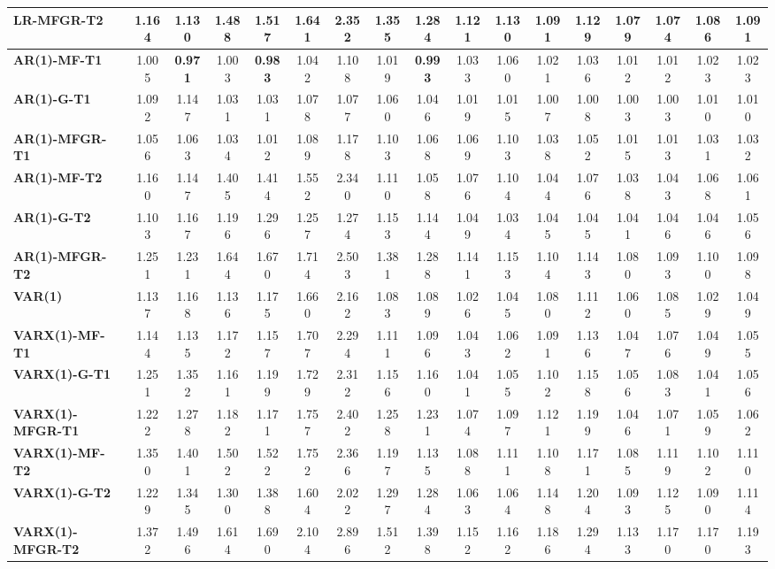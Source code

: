 \documentclass[Theme1]{{template_material/eurostat}}
\begin{document}
\begin{landscape}
\begin{table}[h]
{\begin{tabular}{l|cc|cc|cc|cc|cc|cc|cc|cc}
\textbf{LR-MFGR-T2} & 1.164 & 1.130 & 1.488 & 1.517 & 1.641 & 2.352 & 1.355 & 1.284 & 1.121 & 1.130 & 1.091 & 1.129 & 1.079 & 1.074 & 1.086 & 1.091 \\
\hline
\textbf{AR(1)-MF-T1} & 1.005 & \textbf{0.971} & 1.003 & \textbf{0.983} & 1.042 & 1.108 & 1.019 & \textbf{0.993} & 1.033 & 1.060 & 1.021 & 1.036 & 1.012 & 1.012 & 1.023 & 1.023 \\
\textbf{AR(1)-G-T1} & 1.092 & 1.147 & 1.031 & 1.031 & 1.078 & 1.077 & 1.060 & 1.046 & 1.019 & 1.015 & 1.007 & 1.008 & 1.003 & 1.003 & 1.010 & 1.010 \\
\textbf{AR(1)-MFGR-T1} & 1.056 & 1.063 & 1.034 & 1.012 & 1.089 & 1.178 & 1.103 & 1.068 & 1.069 & 1.103 & 1.038 & 1.052 & 1.015 & 1.013 & 1.031 & 1.032 \\
\textbf{AR(1)-MF-T2} & 1.160 & 1.147 & 1.405 & 1.414 & 1.552 & 2.340 & 1.110 & 1.058 & 1.076 & 1.104 & 1.044 & 1.076 & 1.038 & 1.043 & 1.068 & 1.061 \\
\textbf{AR(1)-G-T2} & 1.103 & 1.167 & 1.196 & 1.296 & 1.257 & 1.274 & 1.153 & 1.144 & 1.049 & 1.034 & 1.045 & 1.045 & 1.041 & 1.046 & 1.046 & 1.056 \\
\textbf{AR(1)-MFGR-T2} & 1.251 & 1.231 & 1.644 & 1.670 & 1.714 & 2.503 & 1.381 & 1.288 & 1.141 & 1.153 & 1.104 & 1.143 & 1.080 & 1.093 & 1.100 & 1.098 \\
\hline
\textbf{VAR(1)} & 1.137 & 1.168 & 1.136 & 1.175 & 1.660 & 2.162 & 1.083 & 1.089 & 1.026 & 1.045 & 1.080 & 1.112 & 1.060 & 1.085 & 1.029 & 1.049 \\
\textbf{VARX(1)-MF-T1} & 1.144 & 1.135 & 1.172 & 1.157 & 1.707 & 2.294 & 1.111 & 1.096 & 1.043 & 1.062 & 1.091 & 1.136 & 1.047 & 1.076 & 1.049 & 1.055 \\
\textbf{VARX(1)-G-T1} & 1.251 & 1.352 & 1.161 & 1.199 & 1.729 & 2.312 & 1.156 & 1.160 & 1.041 & 1.055 & 1.102 & 1.158 & 1.056 & 1.083 & 1.041 & 1.056 \\
\textbf{VARX(1)-MFGR-T1} & 1.222 & 1.278 & 1.182 & 1.171 & 1.757 & 2.402 & 1.258 & 1.231 & 1.074 & 1.097 & 1.121 & 1.199 & 1.046 & 1.071 & 1.059 & 1.062 \\
\textbf{VARX(1)-MF-T2} & 1.350 & 1.401 & 1.502 & 1.522 & 1.752 & 2.366 & 1.197 & 1.135 & 1.088 & 1.111 & 1.108 & 1.171 & 1.085 & 1.119 & 1.102 & 1.110 \\
\textbf{VARX(1)-G-T2} & 1.229 & 1.345 & 1.300 & 1.388 & 1.604 & 2.022 & 1.297 & 1.284 & 1.063 & 1.064 & 1.148 & 1.204 & 1.093 & 1.125 & 1.090 & 1.114 \\
\textbf{VARX(1)-MFGR-T2} & 1.372 & 1.496 & 1.614 & 1.690 & 2.104 & 2.896 & 1.512 & 1.398 & 1.152 & 1.162 & 1.186 & 1.294 & 1.133 & 1.170 & 1.170 & 1.193 \\

\end{tabular}}
\end{table}
\end{landscape}
\end{document}

